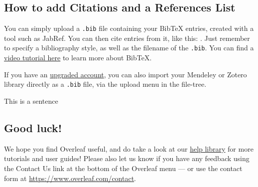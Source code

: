 \documentclass{article}
\begin{document}
\subsection{How to add Citations and a References List}

You can simply upload a \verb|.bib| file containing your BibTeX entries, created with a tool such as JabRef. You can then cite entries from it, like this: \cite{greenwade93}. Just remember to specify a bibliography style, as well as the filename of the \verb|.bib|. You can find a \href{https://www.overleaf.com/help/97-how-to-include-a-bibliography-using-bibtex}{video tutorial here} to learn more about BibTeX.

If you have an \href{https://www.overleaf.com/user/subscription/plans}{upgraded account}, you can also import your Mendeley or Zotero library directly as a \verb|.bib| file, via the upload menu in the file-tree.


This is a sentence


\subsection{Good luck!}

We hope you find Overleaf useful, and do take a look at our \href{https://www.overleaf.com/learn}{help library} for more tutorials and user guides! Please also let us know if you have any feedback using the Contact Us link at the bottom of the Overleaf menu --- or use the contact form at \url{https://www.overleaf.com/contact}.





\end{document}
